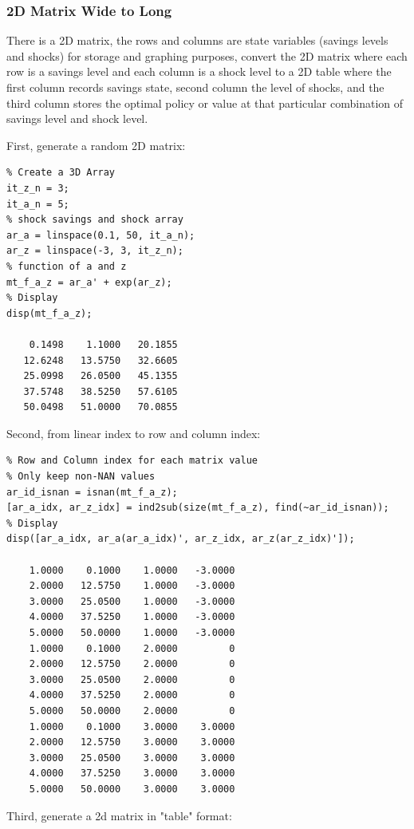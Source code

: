 \documentclass[
]{book}
\begin{document}
\hypertarget{d-matrix-wide-to-long}{%
\subsubsection{2D Matrix Wide to Long}\label{d-matrix-wide-to-long}}

There is a 2D matrix, the rows and columns are state variables (savings
levels and shocks) for storage and graphing purposes, convert the 2D
matrix where each row is a savings level and each column is a shock
level to a 2D table where the first column records savings state, second
column the level of shocks, and the third column stores the optimal
policy or value at that particular combination of savings level and
shock level.

First, generate a random 2D matrix:

\begin{verbatim}
% Create a 3D Array
it_z_n = 3;
it_a_n = 5;
% shock savings and shock array
ar_a = linspace(0.1, 50, it_a_n);
ar_z = linspace(-3, 3, it_z_n);
% function of a and z
mt_f_a_z = ar_a' + exp(ar_z);
% Display
disp(mt_f_a_z);

    0.1498    1.1000   20.1855
   12.6248   13.5750   32.6605
   25.0998   26.0500   45.1355
   37.5748   38.5250   57.6105
   50.0498   51.0000   70.0855
\end{verbatim}

Second, from linear index to row and column index:

\begin{verbatim}
% Row and Column index for each matrix value
% Only keep non-NAN values
ar_id_isnan = isnan(mt_f_a_z);
[ar_a_idx, ar_z_idx] = ind2sub(size(mt_f_a_z), find(~ar_id_isnan));
% Display
disp([ar_a_idx, ar_a(ar_a_idx)', ar_z_idx, ar_z(ar_z_idx)']);

    1.0000    0.1000    1.0000   -3.0000
    2.0000   12.5750    1.0000   -3.0000
    3.0000   25.0500    1.0000   -3.0000
    4.0000   37.5250    1.0000   -3.0000
    5.0000   50.0000    1.0000   -3.0000
    1.0000    0.1000    2.0000         0
    2.0000   12.5750    2.0000         0
    3.0000   25.0500    2.0000         0
    4.0000   37.5250    2.0000         0
    5.0000   50.0000    2.0000         0
    1.0000    0.1000    3.0000    3.0000
    2.0000   12.5750    3.0000    3.0000
    3.0000   25.0500    3.0000    3.0000
    4.0000   37.5250    3.0000    3.0000
    5.0000   50.0000    3.0000    3.0000
\end{verbatim}

Third, generate a 2d matrix in "table" format:
\end{document}
